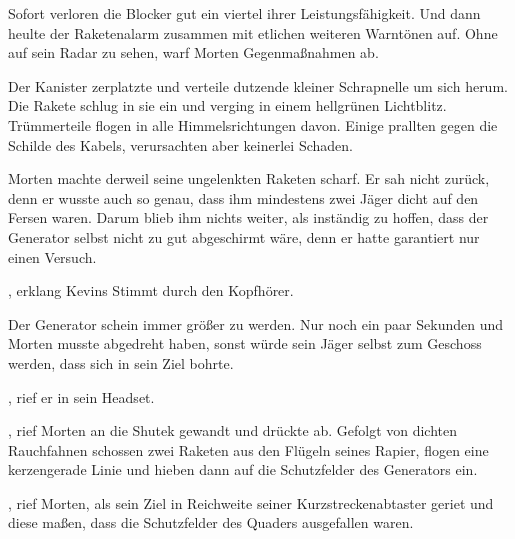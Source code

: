 \par

Sofort verloren die Blocker gut ein viertel ihrer Leistungsfähigkeit. Und dann heulte der Raketenalarm zusammen mit etlichen weiteren Warntönen auf. Ohne auf sein Radar zu sehen, warf Morten Gegenmaßnahmen ab.

\par

Der Kanister zerplatzte und verteile dutzende kleiner Schrapnelle um sich herum. Die Rakete schlug in sie ein und verging in einem hellgrünen Lichtblitz. Trümmerteile flogen in alle Himmelsrichtungen davon. Einige prallten gegen die Schilde des Kabels, verursachten aber keinerlei Schaden.

\par

Morten machte derweil seine ungelenkten Raketen scharf.  Er sah nicht zurück, denn er wusste auch so genau, dass ihm mindestens zwei Jäger dicht auf den Fersen waren. Darum blieb ihm nichts weiter, als inständig zu hoffen, dass der Generator selbst nicht zu gut abgeschirmt wäre, denn er hatte garantiert nur einen Versuch.

\par

, erklang Kevins Stimmt durch den Kopfhörer.

\par

Der Generator schein immer größer zu werden. Nur noch ein paar Sekunden und Morten musste abgedreht haben, sonst würde sein Jäger selbst zum Geschoss werden, dass sich in sein Ziel bohrte.

\par

, rief er in sein Headset.

\par


\par

, rief Morten an die Shutek gewandt und drückte ab. Gefolgt von dichten Rauchfahnen schossen zwei Raketen aus den Flügeln seines Rapier, flogen eine kerzengerade Linie und hieben dann auf die Schutzfelder des Generators ein.

\par

, rief Morten, als sein Ziel in Reichweite seiner Kurzstreckenabtaster geriet und diese maßen, dass die Schutzfelder des Quaders ausgefallen waren.

